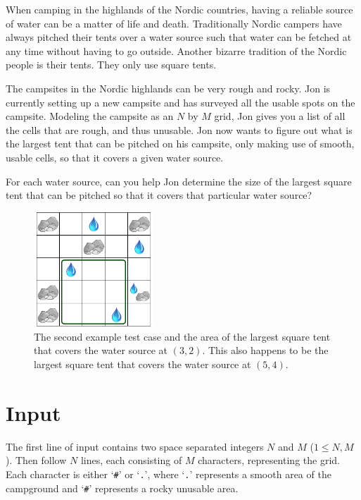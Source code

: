 \def\version{1}

When camping in the highlands of the Nordic countries, having a reliable source
of water can be a matter of life and death. Traditionally Nordic campers have
always pitched their tents over a water source such that water can be fetched
at any time without having to go outside. Another bizarre tradition of the
Nordic people is their tents. They only use square tents.

The campsites in the Nordic highlands can be very rough and rocky. Jon is
currently setting up a new campsite and has surveyed all the usable spots on
the campsite. Modeling the campsite as an $N$ by $M$ grid, Jon gives you a list
of all the cells that are rough, and thus unusable. Jon now wants to figure out
what is the largest tent that can be pitched on his campsite, only making use
of smooth, usable cells, so that it covers a given water source.

For each water source, can you help Jon determine the size of the largest
square tent that can be pitched so that it covers that particular water source?

\begin{figure}[h]
  \centering
  \includegraphics[width=0.4\textwidth]{fig}
  \caption{The second example test case and the area of the largest
    square tent that covers the water source at $(3,2)$. This also happens to
    be the largest square tent that covers the water source at $(5,4)$.}
\end{figure}

\section*{Input}
The first line of input contains two space separated integers $N$ and $M$ ($1
\leq N,M$). Then follow $N$ lines, each consisting of $M$ characters,
representing the grid. Each character is either `\texttt{\#}' or `\texttt{.}',
where `\texttt{.}' represents a smooth area of the campground and `\texttt{\#}'
represents a rocky unusable area.

